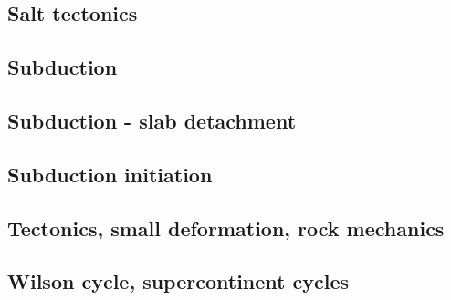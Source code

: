 \subsection*{Salt tectonics}

\cite{zaju92}
\cite{nabr93}
\cite{istt04}
\cite{huja07}

\subsection*{Subduction}

\cite{jarr86}
\cite{hstt90}
\cite{zhgu92}
\cite{jope93}
\cite{zhgu94}
\cite{hajc97}
\cite{itki98}
\cite{hagu99}
\cite{jalo05}
\cite{artd07}\cite{yaab07}
\cite{yaba08}\cite{ozrs08}
\cite{yahb09}
\cite{hagr10}
\cite{anwb12}\cite{jahu12}\cite{jabi12}\cite{jabk12}
\cite{nabg13}\cite{hage13}\cite{ancv13}\cite{namu13}\cite{yosh13}\cite{zhgt13}\cite{jabr13}\cite{izht13}
\cite{hond14}

\subsection*{Subduction - slab detachment}

\cite{yowo95}
\cite{anbi09}

\subsection*{Subduction initiation}

\cite{hags03}
\cite{nigm10}


\subsection*{Tectonics, small deformation, rock mechanics}

\cite{ilma93}
\cite{hept96}

\subsection*{Wilson cycle, supercontinent cycles}

\cite{zhzl07}
\cite{zhzm09}





